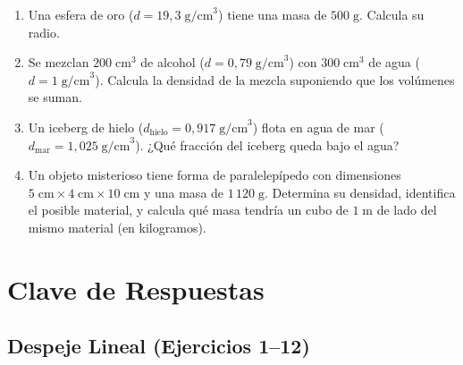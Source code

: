 \documentclass[12pt, a4paper]{article}
\begin{document}
\begin{enumerate}[leftmargin=*, resume]
  \item \dificil{} Una esfera de oro ($d = 19{,}3\;\text{g/cm}^3$) tiene una masa de $500\;\text{g}$. Calcula su radio.

  \item \dificil{} Se mezclan $200\;\text{cm}^3$ de alcohol ($d = 0{,}79\;\text{g/cm}^3$) con $300\;\text{cm}^3$ de agua ($d = 1\;\text{g/cm}^3$). Calcula la densidad de la mezcla suponiendo que los volúmenes se suman.

  \item \dificil{} Un iceberg de hielo ($d_{\text{hielo}} = 0{,}917\;\text{g/cm}^3$) flota en agua de mar ($d_{\text{mar}} = 1{,}025\;\text{g/cm}^3$). ¿Qué fracción del iceberg queda bajo el agua?

  \item \dificil{} Un objeto misterioso tiene forma de paralelepípedo con dimensiones $5\;\text{cm} \times 4\;\text{cm} \times 10\;\text{cm}$ y una masa de $1\,120\;\text{g}$. Determina su densidad, identifica el posible material, y calcula qué masa tendría un cubo de $1\;\text{m}$ de lado del mismo material (en kilogramos).
\end{enumerate}

\newpage

\section{Clave de Respuestas}

\subsection*{Despeje Lineal (Ejercicios 1--12)}
\end{document}
